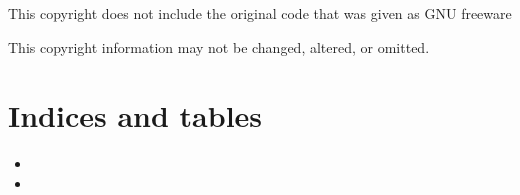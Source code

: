 \documentclass[letterpaper,10pt,english]{sphinxmanual}
\begin{document}
\sphinxAtStartPar
This copyright does not include the original code that was given as GNU freeware

\sphinxAtStartPar
This copyright information may not be changed, altered, or omitted.


\chapter{Indices and tables}
\label{\detokenize{index:indices-and-tables}}\begin{itemize}
\item {} 
\sphinxAtStartPar
{}

\item {} 
\sphinxAtStartPar
{}

\end{itemize}



\renewcommand{\indexname}{Index}
\printindex
\end{document}
